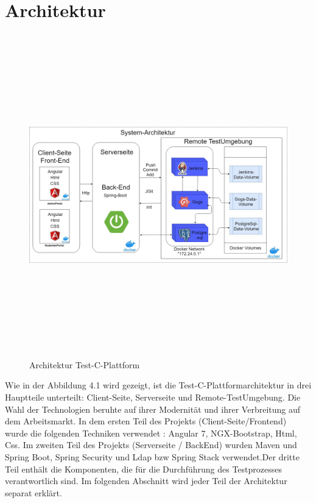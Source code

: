 \documentclass[a4paper,12pt,oneside]{book}
\begin{document}
\section{Architektur}
\begin{figure}[h!]
	\begin{center}
		\includegraphics[width=14cm, height=14cm]{Test-C-Plattform-Arch.jpg}
		\caption{Architektur Test-C-Plattform } 
		\label{ Architektur Test-C-Plattform } 
	\end{center}
\end{figure}
Wie in der Abbildung 4.1 wird gezeigt, ist die Test-C-Plattformarchitektur in drei Hauptteile unterteilt: Client-Seite, Serverseite und Remote-TestUmgebung.
\newline
Die Wahl der Technologien beruhte auf ihrer Modernität und ihrer Verbreitung auf dem Arbeitsmarkt. In dem ersten Teil des Projekts (Client-Seite/Frontend) wurde die folgenden Techniken verwendet : Angular 7, NGX-Bootstrap, Html, Css. Im zweiten Teil des Projekts (Serverseite / BackEnd) wurden Maven und Spring Boot, Spring Security und Ldap bzw Spring Stack verwendet.Der dritte Teil enthält die Komponenten, die für die Durchführung des Testprozesses verantwortlich sind.
\newpage
Im folgenden Abschnitt wird jeder Teil der Architektur separat erklärt.
\newpage
\end{document}
